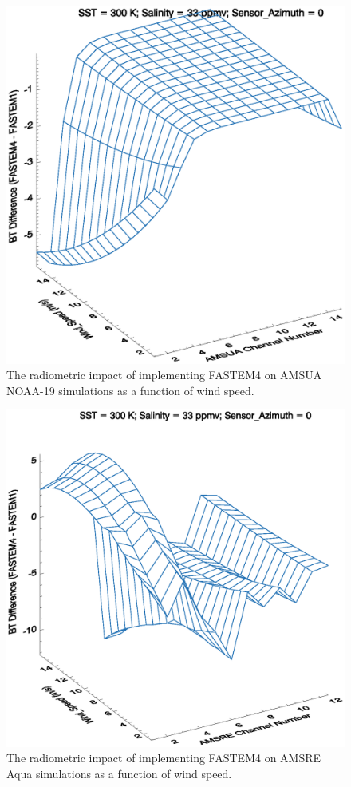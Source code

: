 \begin{figure}[htp]
  \centering
  \includegraphics[scale=0.75]{graphics/AMSUA_Wind_Speed_BT.eps}
  \caption{The radiometric impact of implementing FASTEM4 on AMSUA NOAA-19 simulations as a function of wind speed.}
  \label{fig:AMSUA_Wind_Speed_Impact}
\end{figure}

\newpage

\begin{figure}[htp]
  \centering
  \includegraphics[scale=0.75]{graphics/AMSRE_Wind_Speed_BT.eps}
  \caption{The radiometric impact of implementing FASTEM4 on AMSRE Aqua simulations as a function of wind speed.}
  \label{fig:AMSRE_Wind_Speed_Impact}
\end{figure}

